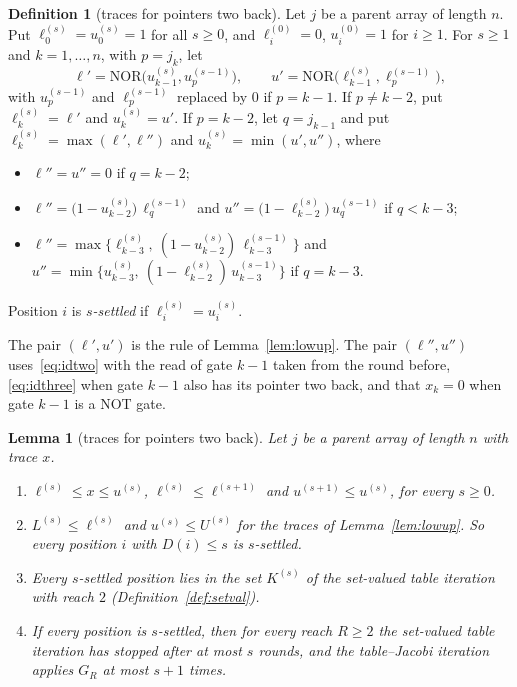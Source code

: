 \documentclass[11pt]{amsart}
\newtheorem{lemma}[theorem]{Lemma}
\theoremstyle{definition}
\newtheorem{definition}[theorem]{Definition}
\theoremstyle{remark}
\newcommand{\NOR}{\mathrm{NOR}}
\begin{document}
\begin{definition}[traces for pointers two back]\label{def:twotraces}
Let $j$ be a parent array of length $n$. Put $\ell^{(s)}_0=u^{(s)}_0=1$ for all $s\ge0$, and
$\ell^{(0)}_i=0$, $u^{(0)}_i=1$ for $i\ge1$. For $s\ge1$ and $k=1,\dots,n$, with $p=j_k$, let
\[
\ell'=\NOR\bigl(u^{(s)}_{k-1},u^{(s-1)}_p\bigr),\qquad u'=\NOR\bigl(\ell^{(s)}_{k-1},\ell^{(s-1)}_p\bigr),
\]
with $u^{(s-1)}_p$ and $\ell^{(s-1)}_p$ replaced by $0$ if $p=k-1$. If $p\ne k-2$, put
$\ell^{(s)}_k=\ell'$ and $u^{(s)}_k=u'$. If $p=k-2$, let $q=j_{k-1}$ and put
$\ell^{(s)}_k=\max(\ell',\ell'')$ and $u^{(s)}_k=\min(u',u'')$, where
\begin{itemize}[leftmargin=2em]
\item $\ell''=u''=0$ if $q=k-2$;
\item $\ell''=\bigl(1-u^{(s)}_{k-2}\bigr)\,\ell^{(s-1)}_q$ and
$u''=\bigl(1-\ell^{(s)}_{k-2}\bigr)\,u^{(s-1)}_q$ if $q<k-3$;
\item $\ell''=\max\bigl\{\ell^{(s)}_{k-3},\ (1-u^{(s)}_{k-2})\,\ell^{(s-1)}_{k-3}\bigr\}$ and
$u''=\min\bigl\{u^{(s)}_{k-3},\ (1-\ell^{(s)}_{k-2})\,u^{(s-1)}_{k-3}\bigr\}$ if $q=k-3$.
\end{itemize}
Position $i$ is \emph{$s$-settled} if $\ell^{(s)}_i=u^{(s)}_i$.
\end{definition}

\noindent The pair $(\ell',u')$ is the rule of Lemma~\ref{lem:lowup}. The pair $(\ell'',u'')$
uses~\eqref{eq:idtwo} with the read of gate $k-1$ taken from the round before,
\eqref{eq:idthree} when gate $k-1$ also has its pointer two back, and that $x_k=0$ when gate
$k-1$ is a NOT gate.

\begin{lemma}[traces for pointers two back]\label{lem:twotraces}
Let $j$ be a parent array of length $n$ with trace $x$.
\begin{enumerate}[label=(\alph*),leftmargin=2.4em]
\item $\ell^{(s)}\le x\le u^{(s)}$, $\ell^{(s)}\le\ell^{(s+1)}$ and $u^{(s+1)}\le u^{(s)}$, for
every $s\ge0$.
\item $L^{(s)}\le\ell^{(s)}$ and $u^{(s)}\le U^{(s)}$ for the traces of
Lemma~\ref{lem:lowup}. So every position $i$ with $D(i)\le s$ is $s$-settled.
\item Every $s$-settled position lies in the set $K^{(s)}$ of the set-valued table iteration
with reach $2$ (Definition~\ref{def:setval}).
\item If every position is $s$-settled, then for every reach $R\ge2$ the set-valued table
iteration has stopped after at most $s$ rounds, and the table--Jacobi iteration applies $G_R$ at
most $s+1$ times.
\end{enumerate}
\end{lemma}
\end{document}
